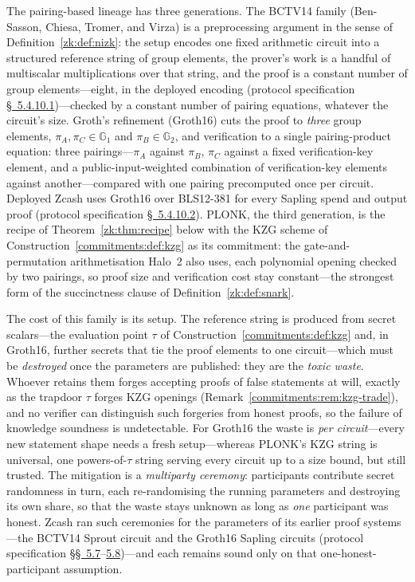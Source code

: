 \documentclass[11pt,a4paper]{article}
\theoremstyle{definition}
\theoremstyle{remark}
\newcommand{\G}{\ensuremath{\mathbb{G}}}
\begin{document}
The pairing-based lineage has three generations. The BCTV14 family
(Ben-Sasson, Chiesa, Tromer, and Virza) is a preprocessing argument
in the sense of Definition~\ref{zk:def:nizk}: the setup encodes one
fixed arithmetic circuit into a structured reference string of group
elements, the prover's work is a handful of multiscalar
multiplications over that string, and the proof is a constant number
of group elements---eight, in the deployed encoding (protocol specification
\href{https://zips.z.cash/protocol/protocol.pdf\#bctv}{\S~5.4.10.1})---checked by a constant number of pairing equations,
whatever the circuit's size. Groth's
refinement (Groth16) cuts the proof to \emph{three} group elements,
\(\pi_A, \pi_C \in \G_1\) and \(\pi_B \in \G_2\), and verification
to a single pairing-product equation: three pairings---\(\pi_A\)
against \(\pi_B\), \(\pi_C\) against a fixed verification-key
element, and a public-input-weighted combination of verification-key
elements against another---compared with one pairing precomputed
once per circuit. Deployed Zcash uses Groth16
over BLS12-381 for every Sapling spend and output proof (protocol
specification \href{https://zips.z.cash/protocol/protocol.pdf\#groth}{\S~5.4.10.2}). PLONK, the
third generation, is the recipe of Theorem~\ref{zk:thm:recipe}
below with the KZG scheme of Construction~\ref{commitments:def:kzg}
as its commitment: the gate-and-permutation arithmetisation Halo~2
also uses, each polynomial opening checked by two pairings, so proof
size and verification cost stay constant---the strongest form of the
succinctness clause of Definition~\ref{zk:def:snark}.

The cost of this family is its setup. The reference string is
produced from secret scalars---the evaluation point \(\tau\) of
Construction~\ref{commitments:def:kzg} and, in Groth16, further
secrets that tie the proof elements to one circuit---which must be
\emph{destroyed} once the parameters are published: they are the
\emph{toxic waste}. Whoever retains them forges accepting proofs of
false statements at will, exactly as the trapdoor \(\tau\) forges
KZG openings (Remark~\ref{commitments:rem:kzg-trade}), and no
verifier can distinguish such forgeries from honest proofs, so the
failure of knowledge soundness is undetectable. For
Groth16 the waste is \emph{per circuit}---every new statement shape
needs a fresh setup---whereas PLONK's KZG string is universal, one
powers-of-\(\tau\) string serving every circuit up to a size bound,
but still trusted. The mitigation is a \emph{multiparty
ceremony}: participants contribute secret randomness in turn, each
re-randomising the running parameters and destroying its own share,
so that the waste stays unknown as long as \emph{one} participant
was honest. Zcash ran such ceremonies for the parameters of its
earlier proof systems---the BCTV14 Sprout circuit and the Groth16
Sapling circuits (protocol specification \href{https://zips.z.cash/protocol/protocol.pdf\#bctvparameters}{\S\S~5.7}--\href{https://zips.z.cash/protocol/protocol.pdf\#grothparameters}{5.8})---and each
remains sound only on that one-honest-participant assumption.
\end{document}
